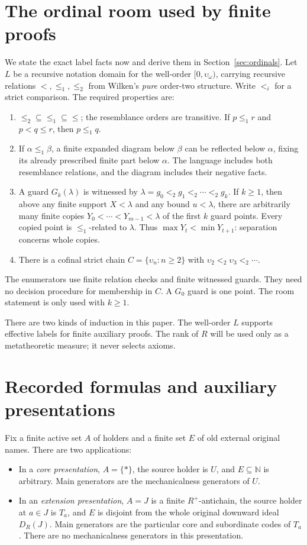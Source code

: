 \documentclass[11pt]{article}
\newcommand{\N}{\mathbb N}
\newcommand{\up}{\upsilon}
\begin{document}
\section{The ordinal room used by finite proofs}\label{sec:room}

We state the exact label facts now and derive them in
Section~\ref{sec:ordinals}. Let $L$ be a recursive notation domain for
the well-order $[0,\up_\omega)$, carrying recursive relations
$<,\le_1,\le_2$ from Wilken's \emph{pure} order-two structure.
Write $<_i$ for a strict comparison. The required properties are:
\begin{enumerate}
\item $\le_2\subseteq\le_1\subseteq\le$; the resemblance orders are
transitive. If $p\le_1r$ and $p<q\le r$, then $p\le_1q$.
\item If $\alpha\le_1\beta$, a finite expanded diagram below $\beta$
can be reflected below $\alpha$, fixing its already prescribed finite
part below $\alpha$. The language includes both resemblance relations,
and the diagram includes their negative facts.
\item A guard $G_k(\lambda)$ is witnessed by
$\lambda=g_0<_2g_1<_2\cdots<_2g_k$. If $k\ge1$, then above any finite
support $X<\lambda$ and any bound $u<\lambda$, there are arbitrarily
many finite copies $Y_0<\cdots<Y_{m-1}<\lambda$ of the first $k$ guard
points. Every copied point is $\le_1$-related to $\lambda$.
Thus $\max Y_t<\min Y_{t+1}$: separation concerns whole copies.
\item There is a cofinal strict chain
$C=\{\up_n:n\ge2\}$ with $\up_2<_2\up_3<_2\cdots$.
\end{enumerate}
The enumerators use finite relation checks and finite witnessed guards.
They need no decision procedure for membership in $C$. A $G_0$ guard
is one point. The room statement is only used with $k\ge1$.

There are two kinds of induction in this paper. The well-order $L$
supports effective labels for finite auxiliary proofs. The rank of $R$
will be used only as a metatheoretic measure; it never selects axioms.

\section{Recorded formulas and auxiliary presentations}\label{sec:recorded}

Fix a finite active set $A$ of holders and a finite set $E$ of old
external original names. There are two applications:
\begin{itemize}
\item In a \emph{core presentation}, $A=\{*\}$, the source holder is
$U$, and $E\subseteq\N$ is arbitrary. Main generators are the
mechanicalness generators of $U$.
\item In an \emph{extension presentation}, $A=J$ is a finite
$R^+$-antichain, the source holder at $a\in J$ is $T_a$, and $E$ is
disjoint from the whole original downward ideal $D_R(J)$. Main
generators are the particular core and subordinate codes of $T_a$.
There are no mechanicalness generators in this presentation.
\end{itemize}
\end{document}
